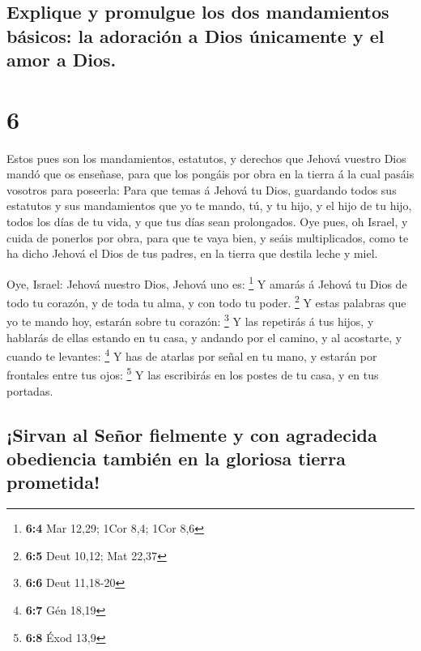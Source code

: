 \hypertarget{explique-y-promulgue-los-dos-mandamientos-buxe1sicos-la-adoraciuxf3n-a-dios-uxfanicamente-y-el-amor-a-dios.}{%
\subsection{Explique y promulgue los dos mandamientos básicos: la
adoración a Dios únicamente y el amor a
Dios.}\label{explique-y-promulgue-los-dos-mandamientos-buxe1sicos-la-adoraciuxf3n-a-dios-uxfanicamente-y-el-amor-a-dios.}}

\hypertarget{section-5}{%
\section{6}\label{section-5}}

 Estos pues son los mandamientos, estatutos, y derechos que
Jehová vuestro Dios mandó que os enseñase, para que los pongáis por obra
en la tierra á la cual pasáis vosotros para poseerla:  Para
que temas á Jehová tu Dios, guardando todos sus estatutos y sus
mandamientos que yo te mando, tú, y tu hijo, y el hijo de tu hijo, todos
los días de tu vida, y que tus días sean prolongados.  Oye
pues, oh Israel, y cuida de ponerlos por obra, para que te vaya bien, y
seáis multiplicados, como te ha dicho Jehová el Dios de tus padres, en
la tierra que destila leche y miel.

 Oye, Israel: Jehová nuestro Dios, Jehová uno es:
\footnote{\textbf{6:4} Mar 12,29; 1Cor 8,4; 1Cor 8,6}  Y
amarás á Jehová tu Dios de todo tu corazón, y de toda tu alma, y con
todo tu poder. \footnote{\textbf{6:5} Deut 10,12; Mat 22,37}
 Y estas palabras que yo te mando hoy, estarán sobre tu
corazón: \footnote{\textbf{6:6} Deut 11,18-20}  Y las
repetirás á tus hijos, y hablarás de ellas estando en tu casa, y andando
por el camino, y al acostarte, y cuando te levantes: \footnote{\textbf{6:7}
  Gén 18,19}  Y has de atarlas por señal en tu mano, y
estarán por frontales entre tus ojos: \footnote{\textbf{6:8} Éxod 13,9}
 Y las escribirás en los postes de tu casa, y en tus
portadas.

\hypertarget{sirvan-al-seuxf1or-fielmente-y-con-agradecida-obediencia-tambiuxe9n-en-la-gloriosa-tierra-prometida}{%
\subsection{¡Sirvan al Señor fielmente y con agradecida obediencia
también en la gloriosa tierra
prometida!}\label{sirvan-al-seuxf1or-fielmente-y-con-agradecida-obediencia-tambiuxe9n-en-la-gloriosa-tierra-prometida}}

